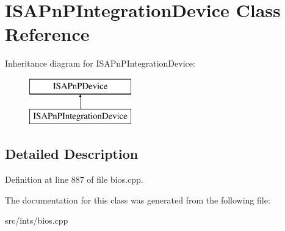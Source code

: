 \hypertarget{classISAPnPIntegrationDevice}{\section{I\-S\-A\-Pn\-P\-Integration\-Device Class Reference}
\label{classISAPnPIntegrationDevice}
}
Inheritance diagram for I\-S\-A\-Pn\-P\-Integration\-Device\-:\begin{figure}[H]
\begin{center}
\leavevmode
\includegraphics[height=2.000000cm]{classISAPnPIntegrationDevice}
\end{center}
\end{figure}


\subsection{Detailed Description}


Definition at line 887 of file bios.\-cpp.



The documentation for this class was generated from the following file\-:\begin{DoxyCompactItemize}
\item 
src/ints/bios.\-cpp\end{DoxyCompactItemize}
